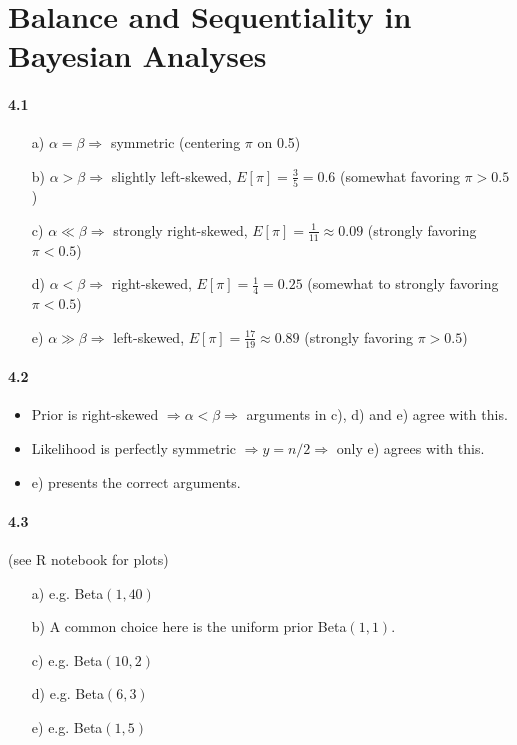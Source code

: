 \documentclass[fontsize=11pt,DIV=18,parskip=half]{scrartcl}
\begin{document}
\section{Balance and Sequentiality in Bayesian Analyses}

\paragraph{4.1}

\begin{enumerate}
\item[a)] $\alpha=\beta \Rightarrow$ symmetric (centering $\pi$ on 0.5)
\item[b)] $\alpha>\beta \Rightarrow$ slightly left-skewed, $E[\pi] = \frac35 = 0.6$ (somewhat favoring $\pi > 0.5$)
\item[c)] $\alpha\ll\beta \Rightarrow$ strongly right-skewed, $E[\pi] = \frac{1}{11} \approx 0.09$ (strongly favoring $\pi < 0.5$)
\item[d)] $\alpha<\beta \Rightarrow$ right-skewed, $E[\pi] = \frac{1}{4} = 0.25$ (somewhat to strongly favoring $\pi < 0.5$)
\item[e)] $\alpha\gg\beta \Rightarrow$ left-skewed, $E[\pi] = \frac{17}{19} \approx 0.89$ (strongly favoring $\pi > 0.5$)
\end{enumerate}

\paragraph{4.2}
\begin{itemize}
\item Prior is right-skewed $\Rightarrow \alpha < \beta \Rightarrow$ arguments in c), d) and e) agree with this.
\item Likelihood is perfectly symmetric $\Rightarrow y=n/2 \Rightarrow$ only e) agrees with this.
\item e) presents the correct arguments.  
\end{itemize}

\paragraph{4.3} (see R notebook for plots)
\begin{enumerate}
\item[a)] e.g. Beta$(1, 40)$
\item[b)] A common choice here is the uniform prior Beta$(1,1)$.
\item[c)] e.g. Beta$(10, 2)$
\item[d)] e.g. Beta$(6, 3)$
\item[e)] e.g. Beta$(1, 5)$
\end{enumerate}
\end{document}
